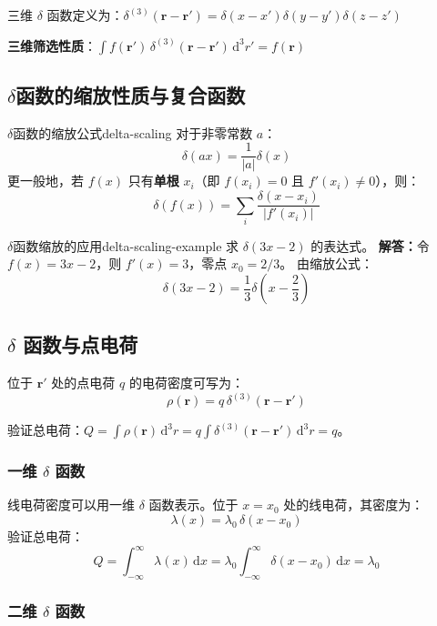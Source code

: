 \documentclass[11pt,a4paper,openany,oneside]{book}
\newcommand{\diff}{\mathrm{d}}
\newcommand{\vect}[1]{\bm{#1}}
\newcommand{\difficulty}[1]{\marginnote{\textcolor{red}{\textbf{[#1]}}}}
\begin{document}
三维 $\delta$ 函数定义为：$\delta^{(3)}(\vect{r} - \vect{r}') = \delta(x-x')\delta(y-y')\delta(z-z')$

\textbf{三维筛选性质}：$\displaystyle\int f(\vect{r}') \, \delta^{(3)}(\vect{r} - \vect{r}') \, \diff^3r' = f(\vect{r})$

\subsection{\texorpdfstring{$\delta$}{δ}函数的缩放性质与复合函数}

\begin{theorem}{$\delta$函数的缩放公式}{delta-scaling}
对于非零常数 $a$：
\[
\delta(ax) = \frac{1}{|a|}\delta(x)
\]
更一般地，若 $f(x)$ 只有\textbf{单根} $x_i$（即 $f(x_i)=0$ 且 $f'(x_i)\neq 0$），则：
\[
\delta(f(x)) = \sum_i \frac{\delta(x-x_i)}{|f'(x_i)|}
\]
\end{theorem}

\begin{example}{$\delta$函数缩放的应用}{delta-scaling-example}
\difficulty{基础}
求 $\delta(3x-2)$ 的表达式。
\tcblower
\textbf{解答：}令 $f(x)=3x-2$，则 $f'(x)=3$，零点 $x_0=2/3$。
由缩放公式：
\[
\delta(3x-2) = \frac{1}{3}\delta\left(x-\frac{2}{3}\right)
\]
\end{example}

\subsection{\texorpdfstring{$\delta$}{δ} 函数与点电荷}

位于 $\vect{r}'$ 处的点电荷 $q$ 的电荷密度可写为：
\[
\rho(\vect{r}) = q \, \delta^{(3)}(\vect{r} - \vect{r}')
\]

验证总电荷：$Q = \int \rho(\vect{r}) \, \diff^3r = q \int \delta^{(3)}(\vect{r} - \vect{r}') \, \diff^3r = q$。

\subsubsection{一维 $\delta$ 函数}

线电荷密度可以用一维 $\delta$ 函数表示。位于 $x = x_0$ 处的线电荷，其密度为：
\[
\lambda(x) = \lambda_0 \, \delta(x - x_0)
\]
验证总电荷：
\[
Q = \int_{-\infty}^{\infty} \lambda(x) \, \diff x = \lambda_0 \int_{-\infty}^{\infty} \delta(x - x_0) \, \diff x = \lambda_0
\]

\subsubsection{二维 $\delta$ 函数}
\end{document}
